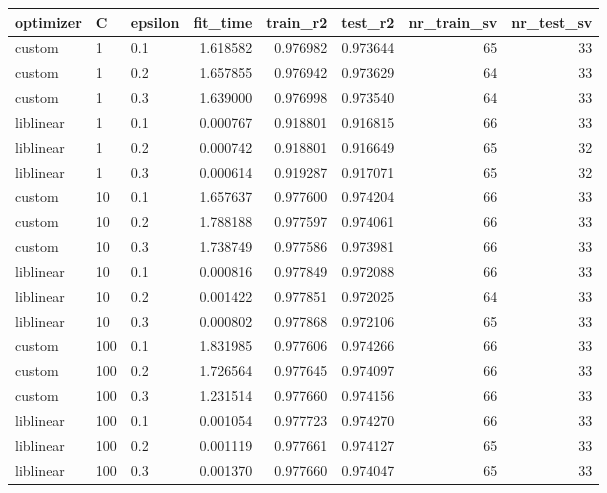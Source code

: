 \begin{tabular}{lllrrrrr}
\toprule
optimizer &   C & epsilon &  fit\_time &  train\_r2 &  test\_r2 &  nr\_train\_sv &  nr\_test\_sv \\
\midrule
   custom &   1 &     0.1 &  1.618582 &  0.976982 & 0.973644 &           65 &          33 \\
   custom &   1 &     0.2 &  1.657855 &  0.976942 & 0.973629 &           64 &          33 \\
   custom &   1 &     0.3 &  1.639000 &  0.976998 & 0.973540 &           64 &          33 \\
liblinear &   1 &     0.1 &  0.000767 &  0.918801 & 0.916815 &           66 &          33 \\
liblinear &   1 &     0.2 &  0.000742 &  0.918801 & 0.916649 &           65 &          32 \\
liblinear &   1 &     0.3 &  0.000614 &  0.919287 & 0.917071 &           65 &          32 \\
   custom &  10 &     0.1 &  1.657637 &  0.977600 & 0.974204 &           66 &          33 \\
   custom &  10 &     0.2 &  1.788188 &  0.977597 & 0.974061 &           66 &          33 \\
   custom &  10 &     0.3 &  1.738749 &  0.977586 & 0.973981 &           66 &          33 \\
liblinear &  10 &     0.1 &  0.000816 &  0.977849 & 0.972088 &           66 &          33 \\
liblinear &  10 &     0.2 &  0.001422 &  0.977851 & 0.972025 &           64 &          33 \\
liblinear &  10 &     0.3 &  0.000802 &  0.977868 & 0.972106 &           65 &          33 \\
   custom & 100 &     0.1 &  1.831985 &  0.977606 & 0.974266 &           66 &          33 \\
   custom & 100 &     0.2 &  1.726564 &  0.977645 & 0.974097 &           66 &          33 \\
   custom & 100 &     0.3 &  1.231514 &  0.977660 & 0.974156 &           66 &          33 \\
liblinear & 100 &     0.1 &  0.001054 &  0.977723 & 0.974270 &           66 &          33 \\
liblinear & 100 &     0.2 &  0.001119 &  0.977661 & 0.974127 &           65 &          33 \\
liblinear & 100 &     0.3 &  0.001370 &  0.977660 & 0.974047 &           65 &          33 \\
\bottomrule
\end{tabular}
